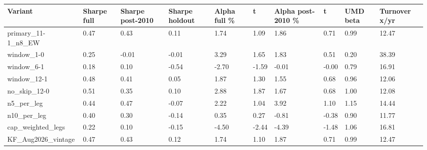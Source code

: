\begin{tabular}{llllllllll}
\toprule
Variant & Sharpe full & Sharpe post-2010 & Sharpe holdout & Alpha full \% & t & Alpha post-2010 \% & t  & UMD beta & Turnover x/yr \\
\midrule
primary\_11-1\_n8\_EW & 0.47 & 0.43 & 0.11 & 1.74 & 1.09 & 1.86 & 0.71 & 0.99 & 12.47 \\
window\_1-0 & 0.25 & -0.01 & -0.01 & 3.29 & 1.65 & 1.83 & 0.51 & 0.20 & 38.39 \\
window\_6-1 & 0.18 & 0.10 & -0.54 & -2.70 & -1.59 & -0.01 & -0.00 & 0.79 & 16.91 \\
window\_12-1 & 0.48 & 0.41 & 0.05 & 1.87 & 1.30 & 1.55 & 0.68 & 0.96 & 12.06 \\
no\_skip\_12-0 & 0.51 & 0.35 & 0.10 & 2.88 & 1.87 & 1.67 & 0.68 & 1.00 & 12.08 \\
n5\_per\_leg & 0.44 & 0.47 & -0.07 & 2.22 & 1.04 & 3.92 & 1.10 & 1.15 & 14.44 \\
n10\_per\_leg & 0.40 & 0.30 & -0.14 & 0.35 & 0.27 & -0.81 & -0.38 & 0.90 & 11.77 \\
cap\_weighted\_legs & 0.22 & 0.10 & -0.15 & -4.50 & -2.44 & -4.39 & -1.48 & 1.06 & 16.81 \\
KF\_Aug2026\_vintage & 0.47 & 0.43 & 0.12 & 1.74 & 1.10 & 1.87 & 0.71 & 0.99 & 12.47 \\
\bottomrule
\end{tabular}
